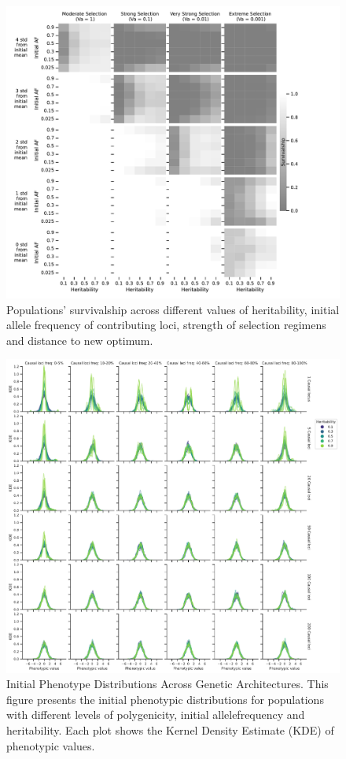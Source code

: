 \documentclass{article}
\begin{document}
\begin{figure}[b]
    \centering
    \includegraphics[width=1\textwidth]{figures/survivalship_forpoly-1.pdf}
    \caption{Populations' survivalship across different values of heritability, initial allele frequency of contributing loci, strength of selection regimens and distance to new optimum.}
    \label{fig:survivalship_forpoly}
\end{figure}

\setcounter{figure}{0}
\renewcommand{\thefigure}{S\arabic{figure}}
\begin{figure}[b]
    \centering
    \includegraphics[width=1\textwidth]{figures/phenotypes_initial-3.pdf}
    \caption{Initial Phenotype Distributions Across Genetic Architectures. This figure presents the initial phenotypic distributions for populations with different levels of polygenicity, initial allelefrequency and heritability. Each plot shows the Kernel Density Estimate (KDE) of phenotypic values.}
    \label{fig:phenotypes_initial}
\end{figure}
\end{document}
